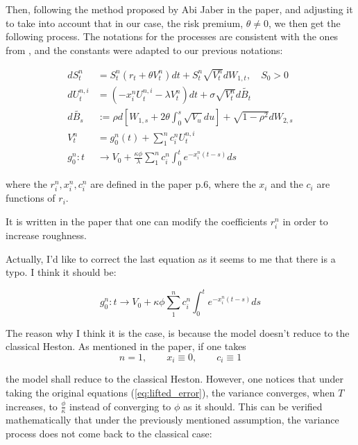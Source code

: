 Then, following the method proposed by Abi Jaber in the paper, and adjusting it to take into account that in our case, the risk premium,  $\theta \neq 0$, we then get the following process. The notations for the processes are consistent with the ones from \cite{lifted}, and the constants were adapted to our previous notations:

\begin{align}
d S_t^n &= S_t^n ( r_t + \theta V_t^n ) dt + S_t^n \sqrt{V_t^n} d W_{1,t}, \quad S_0 > 0  \\
dU_t^{n,i} &= \left ( - x_i^n U_t^{n,i} - \lambda V_t^n \right ) dt + \sigma \sqrt{V_t^n}  d \widetilde{B_t}  \label{eq:lifted_1}  \\
d \widetilde{B_s } &:= \rho d [ W_{1,s} + 2 \theta \int_0^s \sqrt{ V_u } du ] + \sqrt{ 1 - \rho^2 } d W_{2,s}   \\
V_t^n &= g_0^n (t) + \sum^n_1 c_i^n U_t^{n,i} \label{eq:lifted_2} \\
g_0^n  \colon t &\to V_0 + \frac{ \kappa \phi} { \lambda } \sum_1^n c_i^n \int_0^t e^{-x_i^n (t-s) } ds \label{eq:lifted_error}
\end{align}

where the $r_i^n, x_i^n, c_i^n$ are defined in the paper p.6, where the $x_i$ and the $c_i$ are functions of $r_i$.

\begin{remarque}
It is written in the paper that one can modify the coefficients $r_i^n$ in order to increase roughness.
\end{remarque}

Actually, I'd like to correct the last equation as it seems to me that there is a typo. I think it should be:

$$ 
g_0^n  \colon t \to V_0 + \kappa \phi \sum_1^n c_i^n \int_0^t e^{-x_i^n (t-s) } ds
$$

The reason why I think it is the case, is because the model doesn't reduce to the classical Heston. As mentioned in the paper, if one takes 
$$ n = 1, \qquad x_i \equiv 0, \qquad c_i \equiv 1 $$

the model shall reduce to the classical Heston. However, one notices that under taking the original equations (\ref{eq:lifted_error}), the variance converges, when $T$ increases, to $\frac {\phi } {\kappa}$ instead of converging to $\phi$ as it should. This can be verified mathematically that under the previously mentioned assumption, the variance process does not come back to the classical case: 


